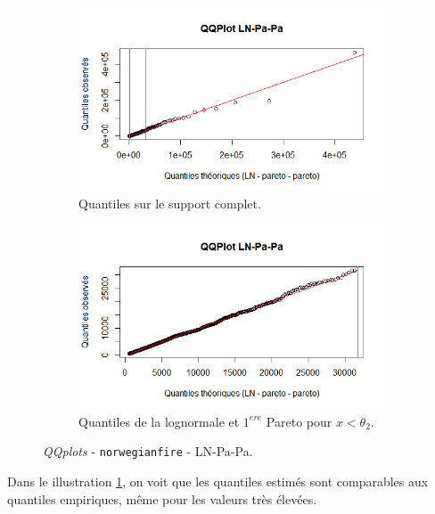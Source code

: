 		\begin{figure}[H]
			\begin{center}
				\begin{subfigure}[b]{0.50\textwidth}
					\includegraphics[scale=0.6]{Graphiques/QQ_LN_Pa_Pa_semi} 
					\caption{Quantiles sur le support complet.} \label{QQplot_LN_PaPa_semi}
				\end{subfigure}
				\begin{subfigure}[b]{0.42\textwidth}
					\includegraphics[scale=0.56]{Graphiques/QQ_LN_Pa_Pa_semi_t1} 
					\caption{Quantiles de la lognormale et $1^{ere}$ Pareto pour $x<\theta_2$.} \label{QQplot_LN_PaPa_semi_t1}
				\end{subfigure}
				\renewcommand{\figurename}{Illustration}
				\caption{\textit{QQplots} - \texttt{norwegianfire} - LN-Pa-Pa.}
			\end{center}
		\end{figure}
	
		Dans le illustration \ref{QQplot_LN_PaPa_semi}, on voit que les quantiles estimés sont comparables aux quantiles empiriques, même pour les valeurs très élevées.
		
